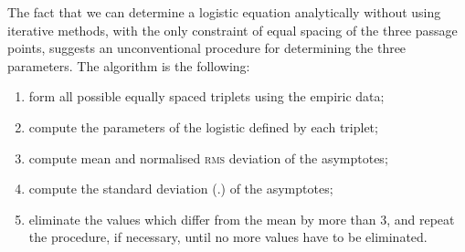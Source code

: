 \documentclass[%
 aip,
 jmp,%
 amsmath,amssymb,
 reprint,%
]{revtex4-1}
\begin{document}
The fact that we can determine a logistic equation analytically without using iterative methods, with the  only constraint of  equal spacing  of the three  passage  points, suggests an unconventional procedure for determining the three parameters. The algorithm is the following:
\begin{enumerate} 
\item form all possible equally spaced triplets using the empiric data;
\item compute the parameters of the logistic defined by each triplet;
\item compute mean and normalised \textsc{rms} deviation of the asymptotes;
\item compute the standard deviation (.) of the asymptotes;
\item eliminate the values which differ from the mean by more than 3, and repeat  the  procedure,  if necessary, until no more values have to be eliminated.
\end{enumerate}
\end{document}
